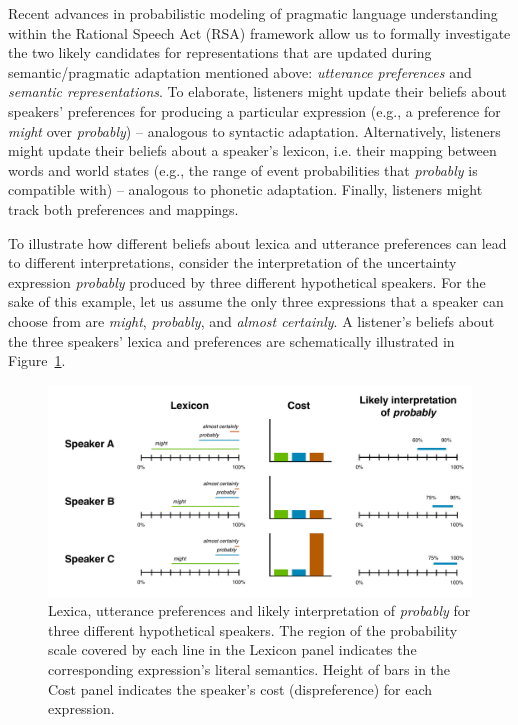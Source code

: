 \documentclass[man, floatsintext]{apa6}
\begin{document}
Recent advances in probabilistic modeling of pragmatic language understanding within the Rational Speech Act (RSA) framework \parencite{Frank2012,Goodman2016,Franke2016} allow us to formally investigate the two likely candidates for representations that are updated during semantic/pragmatic adaptation mentioned above: \emph{utterance preferences} and \emph{semantic representations}. To elaborate,  
listeners might update their beliefs about speakers' preferences
for producing a particular expression (e.g., a preference for \emph{might} over \emph{probably}) -- analogous to syntactic adaptation. Alternatively, listeners might update their beliefs about a speaker's lexicon, i.e. their mapping between 
words and world states (e.g., the range of event probabilities that \emph{probably} is compatible with) -- analogous to phonetic adaptation. Finally, listeners might track both preferences and mappings.

To illustrate how different beliefs about lexica and utterance preferences can lead to different interpretations, consider the interpretation 
of the uncertainty expression \textit{probably} produced by three different hypothetical speakers. For the sake of this example, 
let us assume the only three expressions that a speaker can choose from are \textit{might}, \textit{probably}, and \textit{almost certainly}.
A listener's beliefs about the three speakers' lexica and preferences are schematically illustrated in Figure~\ref{fig:inference-example}.

\begin{figure}
\center
\includegraphics[width=\textwidth]{plots/implicatures.pdf}
\caption{Lexica, utterance preferences and likely interpretation of \textit{probably} for three different hypothetical speakers. The region of the probability scale covered by each line in the Lexicon panel indicates the corresponding expression's literal semantics. Height of bars in the Cost panel indicates the speaker's cost (dispreference) for each expression.}
\label{fig:inference-example}
\end{figure}
\end{document}
